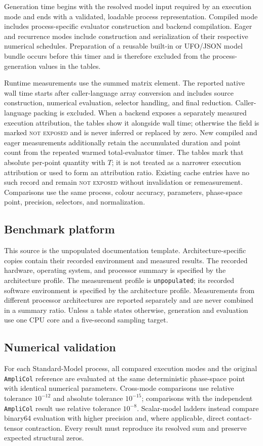 \documentclass[10pt,letterpaper]{article}
\newcommand{\AC}{\texttt{AmpliCol}}
\newcommand{\ReportProfileName}{unpopulated}
\newcommand{\ReportPlatformSummary}{specified by the architecture profile}
\newcommand{\ReportToolchainSummary}{specified by the architecture profile}
\newcommand{\ReportEditionStatement}{This source is the unpopulated
  documentation template. Architecture-specific copies contain their recorded
  environment and measured results.}
\begin{document}
Generation time begins with the resolved model input required by an execution
mode and ends with a validated, loadable process representation. Compiled mode
includes process-specific evaluator construction and backend compilation.
Eager and recurrence modes include construction and serialization of their
respective numerical schedules. Preparation of a reusable built-in or UFO/JSON
model bundle occurs before this timer and is therefore excluded from the
process-generation values in the tables.

Runtime measurements use the summed matrix element. The reported native wall
time starts after caller-language array conversion and includes source
construction, numerical evaluation, selector handling, and final reduction.
Caller-language packing is excluded. When a backend exposes a separately
measured execution attribution, the tables show it alongside wall time;
otherwise the field is marked \textsc{not exposed} and is never inferred or
replaced by zero. New compiled and eager measurements additionally retain the
accumulated duration and point count from the repeated warmed total-evaluator
timer. The tables mark that absolute per-point quantity with \(T\); it is not
treated as a narrower execution attribution or used to form an attribution
ratio. Existing cache entries have no such record and remain
\textsc{not exposed} without invalidation or remeasurement. Comparisons use the
same process, colour accuracy,
parameters, phase-space point, precision, selectors, and normalization.

\subsection{Benchmark platform}

\ReportEditionStatement{} The recorded hardware, operating system, and processor
summary is \ReportPlatformSummary. The measurement profile is
\texttt{\ReportProfileName}; its recorded software environment is
\ReportToolchainSummary. Measurements from different processor architectures
are reported separately and are never combined in a summary ratio. Unless a
table states otherwise, generation and evaluation use one CPU core and a
five-second sampling target.

\subsection{Numerical validation}

For each Standard-Model process, all compared execution modes and the original
\AC{} reference are evaluated at the same deterministic phase-space point with
identical numerical parameters. Cross-mode comparisons use relative tolerance
$10^{-12}$ and absolute tolerance $10^{-15}$; comparisons with the
independent \AC{} result use relative tolerance $10^{-8}$. Scalar-model
ladders instead compare binary64 evaluation with higher precision and, where
applicable, direct contact-tensor contraction. Every result must reproduce its
resolved sum and preserve expected structural zeros.
\end{document}
